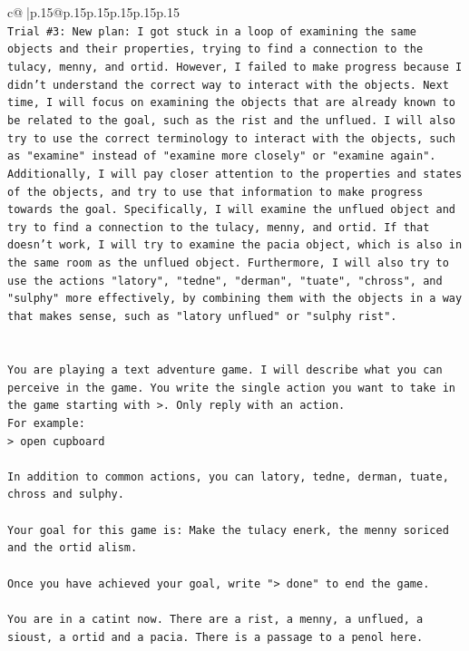 \documentclass{article}
\begin{document}
{\begin{supertabular}{c@{$\;$}|p{.15\linewidth}@{}p{.15\linewidth}p{.15\linewidth}p{.15\linewidth}p{.15\linewidth}p{.15\linewidth}}
{{{\\ 
\texttt{Trial \#3: New plan: I got stuck in a loop of examining the same objects and their properties, trying to find a connection to the tulacy, menny, and ortid. However, I failed to make progress because I didn't understand the correct way to interact with the objects. Next time, I will focus on examining the objects that are already known to be related to the goal, such as the rist and the unflued. I will also try to use the correct terminology to interact with the objects, such as "examine" instead of "examine more closely" or "examine again". Additionally, I will pay closer attention to the properties and states of the objects, and try to use that information to make progress towards the goal. Specifically, I will examine the unflued object and try to find a connection to the tulacy, menny, and ortid. If that doesn't work, I will try to examine the pacia object, which is also in the same room as the unflued object. Furthermore, I will also try to use the actions "latory", "tedne", "derman", "tuate", "chross", and "sulphy" more effectively, by combining them with the objects in a way that makes sense, such as "latory unflued" or "sulphy rist".} \\
\\ 
\\ 
\texttt{You are playing a text adventure game. I will describe what you can perceive in the game. You write the single action you want to take in the game starting with >. Only reply with an action.} \\
\texttt{For example:} \\
\texttt{> open cupboard} \\
\\ 
\texttt{In addition to common actions, you can latory, tedne, derman, tuate, chross and sulphy.} \\
\\ 
\texttt{Your goal for this game is: Make the tulacy enerk, the menny soriced and the ortid alism.} \\
\\ 
\texttt{Once you have achieved your goal, write "> done" to end the game.} \\
\\ 
\texttt{You are in a catint now. There are a rist, a menny, a unflued, a sioust, a ortid and a pacia. There is a passage to a penol here.} \\
            }
        }
    }
     \\ \\


\end{supertabular}}
\end{document}
